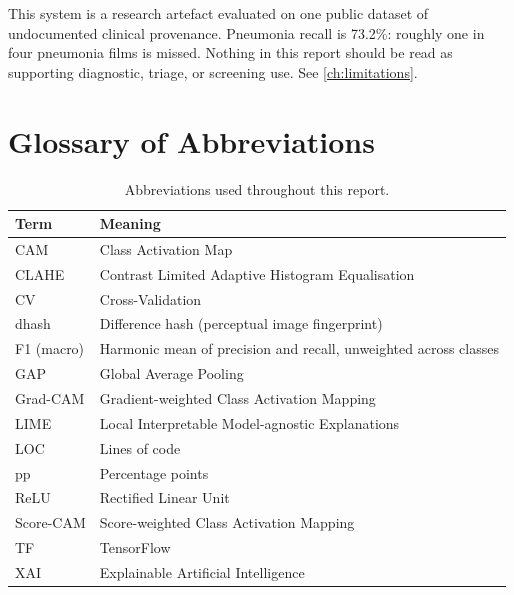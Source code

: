 \documentclass[11pt,a4paper,oneside]{report}
\begin{document}
\begin{warningbox}
This system is a research artefact evaluated on one public dataset of
undocumented clinical provenance. Pneumonia recall is 73.2\%: roughly one in
four pneumonia films is missed. Nothing in this report should be read as
supporting diagnostic, triage, or screening use. See \cref{ch:limitations}.
\end{warningbox}

\clearpage
\tableofcontents
\clearpage
\listoffigures
\clearpage
\listoftables
\clearpage

\chapter*{Glossary of Abbreviations}
\begin{table}[h]
\centering
\small
\begin{tabular}{@{}ll@{}}
\toprule
\textbf{Term} & \textbf{Meaning} \\
\midrule
CAM & Class Activation Map \\
CLAHE & Contrast Limited Adaptive Histogram Equalisation \\
CV & Cross-Validation \\
dhash & Difference hash (perceptual image fingerprint) \\
F1 (macro) & Harmonic mean of precision and recall, unweighted across classes \\
GAP & Global Average Pooling \\
Grad-CAM & Gradient-weighted Class Activation Mapping \\
LIME & Local Interpretable Model-agnostic Explanations \\
LOC & Lines of code \\
pp & Percentage points \\
ReLU & Rectified Linear Unit \\
Score-CAM & Score-weighted Class Activation Mapping \\
TF & TensorFlow \\
XAI & Explainable Artificial Intelligence \\
\bottomrule
\end{tabular}
\caption{Abbreviations used throughout this report.}
\end{table}
\end{document}
